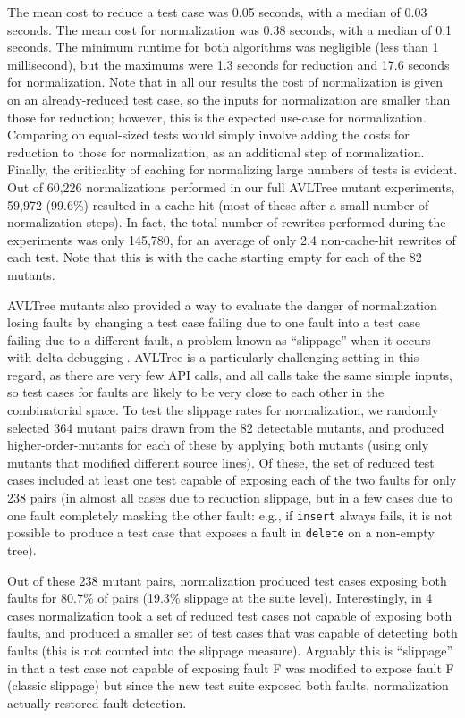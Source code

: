 The mean cost to reduce a
test case was 0.05 seconds, with a median of 0.03 seconds.  The mean
cost for normalization was 0.38 seconds, with a median of 0.1 seconds.
The minimum runtime for both algorithms was negligible (less than 1
millisecond), but the maximums were 1.3 seconds for reduction and 17.6
seconds for normalization.  Note that in all our results the cost of
normalization is given on an already-reduced test case, so the inputs
for normalization are smaller than those for reduction; however, this
is the expected use-case for normalization.  Comparing on equal-sized
tests would simply involve adding the costs for reduction to those for
normalization, as an additional step of normalization.  Finally, the
criticality of caching for normalizing large numbers of tests is
evident.  Out of 60,226 normalizations performed in our full AVLTree mutant
experiments, 59,972 (99.6\%) resulted in a cache hit (most of these
after a small number of normalization steps).  In fact, the total
number of rewrites performed during the experiments was only 145,780,
for an average of only 2.4 non-cache-hit rewrites of each test.  Note
that this is with the cache starting empty for each of the 82 mutants.

AVLTree mutants also provided a way to evaluate the danger of
normalization losing faults by changing a test case failing due to one
fault into a test case failing due to a different fault, a problem
known as ``slippage'' when it occurs with delta-debugging
\cite{PLDI13}.  AVLTree is a particularly challenging setting in this
regard, as there are very few API calls, and all calls take the same
simple inputs, so test cases for faults are likely to be very close to
each other in the combinatorial space.  To test the slippage rates for
normalization, we randomly selected 364 mutant pairs drawn from the 82
detectable mutants, and produced higher-order-mutants for each of
these by applying both mutants (using only mutants that modified
different source lines).  Of these, the set of reduced test cases
included at least one test capable of exposing each of the two faults
for only 238 pairs (in almost all cases due to reduction slippage, but
in a few cases due to one fault completely masking the other fault:  e.g., if
{\tt insert} always fails, it is not possible to produce a test case
that exposes a fault in {\tt delete} on a non-empty tree).

Out of these 238 mutant pairs, normalization produced test cases
exposing both faults for 80.7\% of pairs (19.3\% slippage at the
suite level).  Interestingly, in 4 cases
normalization took a set of reduced test cases not capable of exposing
both faults, and produced a smaller set of test cases that was capable
of detecting both faults (this is not counted into the slippage
measure).  Arguably this is ``slippage'' in that a test case not
capable of exposing fault F was modified to expose fault F (classic
slippage) but since the new test suite exposed both faults,
normalization actually restored fault detection.

